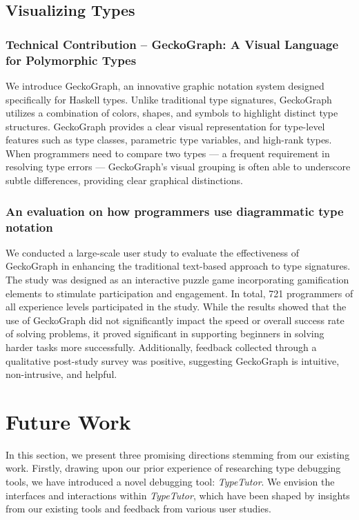 \subsection{Visualizing Types}

\subsubsection{Technical Contribution -- GeckoGraph: A Visual Language for Polymorphic Types}

We introduce GeckoGraph, an innovative graphic notation system designed specifically for Haskell types. Unlike traditional type signatures, GeckoGraph utilizes a combination of colors, shapes, and symbols to highlight distinct type structures. GeckoGraph provides a clear visual representation for type-level features such as type classes, parametric type variables, and high-rank types. When programmers need to compare two types — a frequent requirement in resolving type errors — GeckoGraph's visual grouping is often able to underscore subtle differences, providing clear graphical distinctions.

\subsubsection{An evaluation on how programmers use diagrammatic type notation}

We conducted a large-scale user study to evaluate the effectiveness of GeckoGraph in enhancing the traditional text-based approach to type signatures. The study was designed as an interactive puzzle game incorporating gamification elements to stimulate participation and engagement. In total,  721 programmers of all experience levels participated in the study. While the results showed that the use of GeckoGraph did not significantly impact the speed or overall success rate of solving problems, it proved significant in supporting beginners in solving harder tasks more successfully. Additionally, feedback collected through a qualitative post-study survey was positive, suggesting GeckoGraph is intuitive, non-intrusive, and helpful.

\section{Future Work}

In this section, we present three promising directions stemming from our existing work. Firstly, drawing upon our prior experience of researching type debugging tools, we have introduced a novel debugging tool: \textit{TypeTutor}. We envision the interfaces and interactions within \textit{TypeTutor}, which have been shaped by insights from our existing tools and feedback from various user studies.

